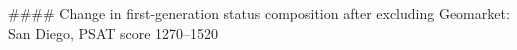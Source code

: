 #### Change in first-generation status composition after excluding Geomarket: San Diego, PSAT score 1270–1520
